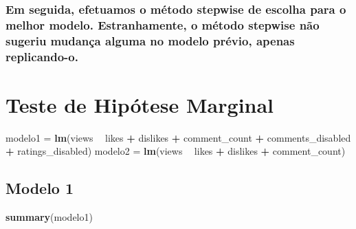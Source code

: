 \documentclass[]{article}
\newenvironment{Shaded}{\begin{snugshade}}{\end{snugshade}}
\newcommand{\KeywordTok}[1]{\textcolor[rgb]{0.13,0.29,0.53}{\textbf{#1}}}
\newcommand{\NormalTok}[1]{#1}
\newcommand{\OperatorTok}[1]{\textcolor[rgb]{0.81,0.36,0.00}{\textbf{#1}}}
\newcommand{\StringTok}[1]{\textcolor[rgb]{0.31,0.60,0.02}{#1}}
\begin{document}
\hypertarget{em-seguida-efetuamos-o-metodo-stepwise-de-escolha-para-o-melhor-modelo.-estranhamente-o-metodo-stepwise-nao-sugeriu-mudanca-alguma-no-modelo-previo-apenas-replicando-o.}{%
\subsubsection{Em seguida, efetuamos o método stepwise de escolha para o
melhor modelo. Estranhamente, o método stepwise não sugeriu mudança
alguma no modelo prévio, apenas
replicando-o.}\label{em-seguida-efetuamos-o-metodo-stepwise-de-escolha-para-o-melhor-modelo.-estranhamente-o-metodo-stepwise-nao-sugeriu-mudanca-alguma-no-modelo-previo-apenas-replicando-o.}}

\hypertarget{teste-de-hipotese-marginal}{%
\section{Teste de Hipótese Marginal}\label{teste-de-hipotese-marginal}}

\begin{Shaded}
\begin{Highlighting}[]
\NormalTok{  modelo1 =}\StringTok{ }\KeywordTok{lm}\NormalTok{(views }\OperatorTok{~}\StringTok{ }\NormalTok{likes }\OperatorTok{+}\StringTok{ }\NormalTok{dislikes }\OperatorTok{+}\StringTok{ }\NormalTok{comment_count }\OperatorTok{+}\StringTok{ }\NormalTok{comments_disabled }\OperatorTok{+}\StringTok{ }\NormalTok{ratings_disabled)}
\NormalTok{  modelo2 =}\StringTok{ }\KeywordTok{lm}\NormalTok{(views }\OperatorTok{~}\StringTok{ }\NormalTok{likes }\OperatorTok{+}\StringTok{ }\NormalTok{dislikes }\OperatorTok{+}\StringTok{ }\NormalTok{comment_count)}
\end{Highlighting}
\end{Shaded}

\hypertarget{modelo-1}{%
\subsection{Modelo 1}\label{modelo-1}}

\begin{Shaded}
\begin{Highlighting}[]
  \KeywordTok{summary}\NormalTok{(modelo1)}
\end{Highlighting}
\end{Shaded}
\end{document}
